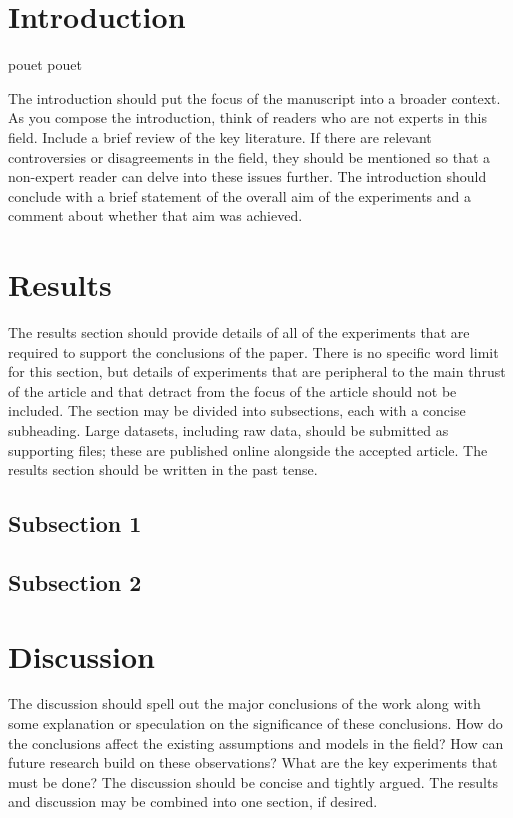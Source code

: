\documentclass[10pt]{article}
\begin{document}
\section*{Introduction}

pouet \cite{Krotzsch2012} pouet

The introduction should put the focus of the manuscript into a broader context. 
As you compose the introduction, think of readers who are not experts in this field. 
Include a brief review of the key literature. If there are relevant controversies or disagreements in 
the field, they should be mentioned so that a non-expert reader can delve into these issues further. 
The introduction should conclude with a brief statement of the overall aim of the experiments and a comment 
about whether that aim was achieved.

\section*{Results}

The results section should provide details of all of the experiments that 
are required to support the conclusions of the paper. There is no specific word limit for 
this section, but details of experiments that are peripheral to the main thrust of the article and that 
detract from the focus of the article should not be included. The section may be divided into subsections, 
each with a concise subheading. Large datasets, including raw data, should be submitted as supporting files; 
these are published online alongside the accepted article. The results section should be written in the past tense.

\subsection*{Subsection 1}

\subsection*{Subsection 2}

\section*{Discussion}

The discussion should spell out the major conclusions of the work along with some 
explanation or speculation on the significance of these conclusions. How do the 
conclusions affect the existing assumptions and models in the field? How can future research 
build on these observations? What are the key experiments that must be done? The discussion should 
be concise and tightly argued. The results and discussion may be combined into one section, if desired.
\end{document}
